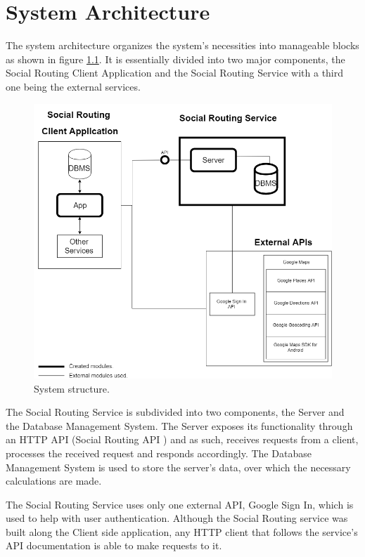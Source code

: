 \chapter{System Architecture}     
        The system architecture organizes the system's necessities into manageable blocks as shown in figure \ref{fig:systemstructure}.
        It is essentially divided into two major components, the Social Routing Client Application \cite{clientapplicationdocs} and the Social Routing Service with a third one being the external services.
        
        \vfill
        \begin{figure}[h]            
            \includegraphics[width=\textwidth]{images/project-structure/system-structure.PNG}
            \caption{System structure.}
            \label{fig:systemstructure}
        \end{figure} 

        The Social Routing Service is subdivided into two components, the Server and the Database Management System\cite{dbmsdefinition}. The Server exposes its
        functionality through an HTTP\cite{httponlinedocs} API\cite{api} (Social Routing API \cite{apidocs}) and as such, receives requests from a client, processes the received request and responds accordingly.
        The Database Management System is used to store the server's data, over which the necessary calculations are made.\par The Social 
        Routing Service uses only one external API, Google Sign In\cite{googlesignindocs}, which is used to help with user authentication. Although the Social Routing
        service was built along the Client side application, any HTTP client that follows the service's API documentation is able to make requests
        to it.        

